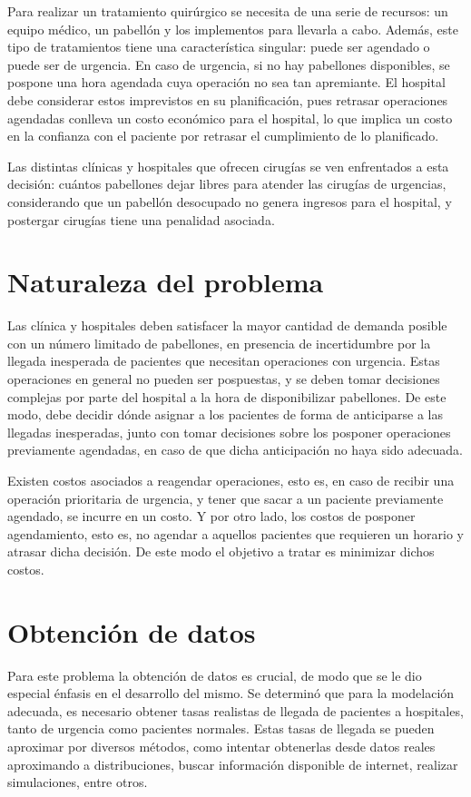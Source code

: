 \documentclass[letterpaper,10pt]{article}
\begin{document}
Para realizar un tratamiento quirúrgico se necesita de una serie de recursos: un equipo médico, un pabellón y los implementos para llevarla a cabo. Además, este tipo de tratamientos tiene una característica singular: puede ser agendado o puede ser de urgencia. En caso de urgencia, si no hay pabellones disponibles, se pospone una hora agendada cuya operación no sea tan apremiante. El hospital debe considerar estos imprevistos en su planificación, pues retrasar operaciones agendadas conlleva un costo económico para el hospital, lo que implica un costo en la confianza con el paciente por retrasar el cumplimiento de lo planificado.

Las distintas clínicas y hospitales que ofrecen cirugías se ven enfrentados a esta decisión: cuántos pabellones dejar libres para atender las cirugías de urgencias, considerando que un pabellón desocupado no genera ingresos para el hospital, y postergar cirugías tiene una penalidad asociada.

\section*{Naturaleza del problema}
Las clínica y hospitales deben satisfacer la mayor cantidad de demanda posible con un número limitado de pabellones, en presencia de incertidumbre por la llegada inesperada de pacientes que necesitan operaciones con urgencia. Estas operaciones en general no pueden ser pospuestas, y se deben tomar decisiones complejas por parte del hospital a la hora de disponibilizar pabellones. De este modo, debe decidir dónde asignar a los pacientes de forma de anticiparse a las llegadas inesperadas, junto con tomar decisiones sobre los posponer operaciones previamente agendadas, en caso de que dicha anticipación no haya sido adecuada. 

Existen costos asociados a reagendar operaciones, esto es, en caso de recibir una operación prioritaria de urgencia, y tener que sacar a un paciente previamente agendado, se incurre en un costo. Y por otro lado, los costos de posponer agendamiento, esto es, no agendar a aquellos pacientes que requieren un horario y atrasar dicha decisión. De este modo el objetivo a tratar es minimizar dichos costos.

\section*{Obtención de datos}

Para este problema la obtención de datos es crucial, de modo que se le dio especial énfasis en el desarrollo del mismo. Se determinó que para la modelación adecuada, es necesario obtener tasas realistas de llegada de pacientes a hospitales, tanto de urgencia como pacientes normales. Estas tasas de llegada se pueden aproximar por diversos métodos, como intentar obtenerlas desde datos reales aproximando a distribuciones, buscar información disponible de internet, realizar simulaciones, entre otros.
\end{document}
